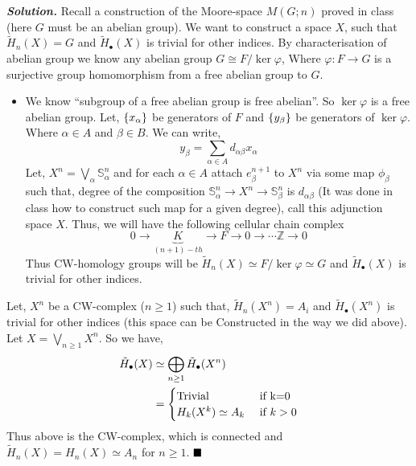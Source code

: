 \documentclass[11pt]{article}
\newcommand{\bb}[1]{\mathbb{#1}}
\newcommand{\Z}{\bb{Z}}
\newcommand{\s}{\bb{S}}
\newcommand{\sol}{ \textbf{\textit{Solution.}} }
\newcommand{\htt}{\tilde{H}}
\newcommand{\htb}{\tilde{H}_{\bullet}}
\begin{document}
 \sol Recall a construction of the Moore-space $M(G;n)$ proved in class (here $G$ must be an abelian group). We want to construct a space $X$, such that $\htt_n(X)=G$ and $\htb(X)$ is trivial for other indices. By characterisation of abelian group we know any abelian group $G\cong F/ \ker \varphi$, Where $\varphi : F \to G$ is a surjective group homomorphism from a free abelian group to $G$. 
\begin{itemize}
    \item[] We know ``subgroup of a free abelian group is free abelian''. So $\ker \varphi$ is a free abelian group. Let, $\qty{x_{\alpha}}$ be generators of $F$ and $\qty{y_{\beta}}$ be generators of $\ker \varphi$. Where $\alpha \in A$ and $\beta \in B$. We can write, $$y_{\beta} = \sum_{\alpha \in A} d_{\alpha \beta}x_{\alpha}$$
    Let, $X^n=\bigvee_{\alpha}\s^n_{\alpha}$ and for each $\alpha \in A$ attach $e_{\beta}^{n+1}$ to $X^n$ via some map $\phi_{\beta}$ such that, degree of the composition $\s^n_{\alpha} \to X^n \to \s^n_{\beta}$ is $d_{\alpha \beta}$ (It was done in class how to construct such map for a given degree), call this adjunction space $X$. Thus, we will have the following cellular chain complex $$0 \to \underbrace{K}_{(n+1)-th} \rightarrow F \to 0 \to \cdots \Z \to 0$$ Thus CW-homology groups will be $\htt_n(X) \simeq F/\ker \varphi \simeq G$ and $\htb(X)$ is trivial for other indices.
\end{itemize}
Let, $X^n$ be a CW-complex ($n\geq 1$) such that, $\htt_n(X^n)= A_i$ and $\htb(X^n)$ is trivial for other indices (this space can be Constructed in the way we did above). Let $X = \bigvee_{n\geq 1}X^n$. So we have, \begin{align*}
    \htb(X) &\simeq \bigoplus_{n\geq 1} \htb(X^n) \\
    &= \begin{cases}
        \text{Trivial} & \text{ if }  $k=0$\\
        H_k(X^k) \simeq A_k & \text{ if } k>0
    \end{cases}
\end{align*}
Thus above is the CW-complex, which is connected and $\htt_n(X) = H_n(X) \simeq A_n$ for $n \geq 1$. $\hfill \blacksquare$
\end{document}
